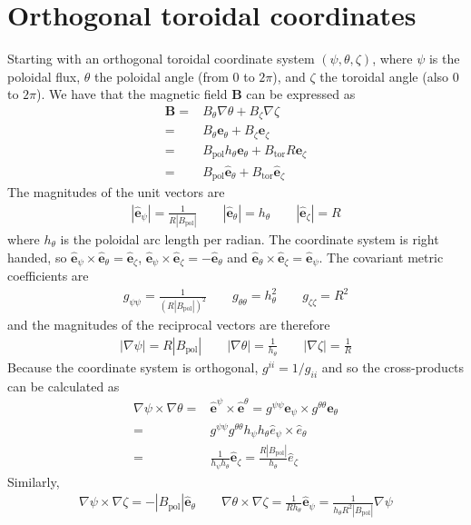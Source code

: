 \documentclass[12pt]{article}
\def\L{\left}
\def\R{\right}
\newcommand{\hthe}{\ensuremath{h_\theta}}
\newcommand{\Bp}{\ensuremath{B_{\text{pol}}}}
\newcommand{\Bt}{\ensuremath{B_{\text{tor}}}}
\newcommand{\ve}[1]{\ensuremath{\boldsymbol{#1}}}
\newcommand{\hv}[1]{\hat{\ve{#1}}}
\newcommand{\Bvec}{\ve{B}}
\begin{document}
\section{Orthogonal toroidal coordinates}
%
\label{sec:coordinates}
Starting with an orthogonal toroidal coordinate system $\L(\psi, \theta,
\zeta\R)$, where $\psi$ is the poloidal flux, $\theta$ the poloidal angle
(from $0$ to $2\pi$), and $\zeta$ the toroidal angle (also $0$ to $2\pi$). We
have that the magnetic field $\Bvec$ can be expressed as
%
\begin{align*}
 \Bvec =& B_\theta \nabla \theta + B_\zeta \nabla \zeta\\ =& B_\theta
    \ve{e}_\theta + B_\zeta \ve{e}_\zeta\\ =& \Bp h_\theta \ve{e}_\theta + \Bt
    R \ve{e}_\zeta\\ =& \Bp \hv{e}_\theta + \Bt \hv{e}_\zeta
\end{align*}
%
The magnitudes of the unit vectors are
%
\begin{align*}
\L|\hv{e}_\psi\R| = \frac{1}{R\L|\Bp\R|} \qquad
\L|\hv{e}_\theta\R| = \hthe \qquad
\L|\hv{e}_\zeta\R| = R
\end{align*}
%
where $\hthe$ is the poloidal arc length per radian.  The coordinate system is
right handed, so $\hv{e}_\psi\times\hv{e}_\theta = \hv{e}_\zeta$,
$\hv{e}_\psi\times\hv{e}_\zeta = -\hv{e}_\theta$ and
$\hv{e}_\theta\times\hv{e}_\zeta = \hv{e}_\psi$. The covariant metric
coefficients are
%
\begin{align*}
g_{\psi\psi} = \frac{1}{\L(R\L|\Bp\R|\R)^2} \qquad
g_{\theta\theta} = h_\theta^2 \qquad g_{\zeta\zeta} = R^2
\end{align*}
%
and the magnitudes of the reciprocal vectors are therefore
%
\begin{align*}
\L|\nabla\psi\R| = R\L|\Bp\R| \qquad \L|\nabla\theta\R| =
\frac{1}{h_\theta} \qquad \L|\nabla\zeta\R| = \frac{1}{R}
\end{align*}
%
Because the coordinate system is orthogonal, $g^{ii} = 1/g_{ii}$ and so the
cross-products can be calculated as
%
\begin{align*}
\nabla\psi\times\nabla\theta = &\hv{e}^\psi\times \hv{e}^\theta =
    g^{\psi\psi}\ve{e}_\psi\times g^{\theta\theta}\ve{e}_\theta \nonumber \\ =
    & g^{\psi\psi}g^{\theta\theta}h_\psi h_\theta
    \hat{e}_\psi\times\hat{e}_\theta \nonumber \\ = &\frac{1}{h_\psi
h_\theta}\hv{e}_\zeta = \frac{R\L|\Bp\R|}{h_\theta}\hat{e}_\zeta
\end{align*}
%
Similarly,
%
\begin{align*}
\nabla\psi\times\nabla\zeta = -\L|\Bp\R|\hv{e}_\theta \qquad
\nabla\theta\times\nabla\zeta = \frac{1}{Rh_\theta}\hv{e}_\psi =
\frac{1}{h_\theta R^2\L|\Bp\R|}\nabla \psi
\end{align*}
%
\end{document}
